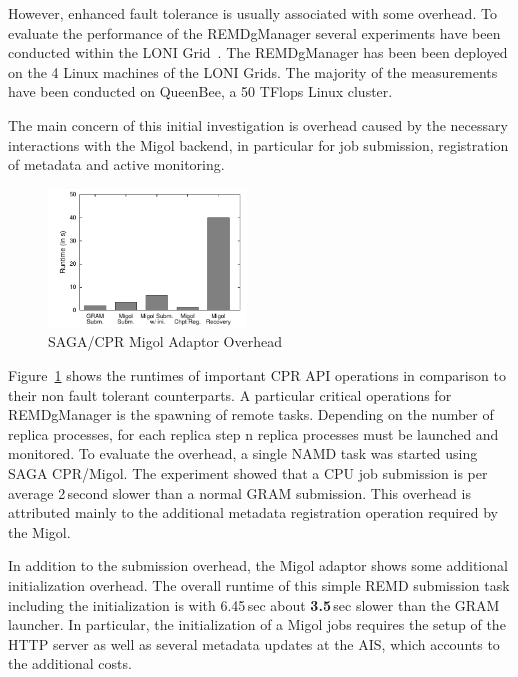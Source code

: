 \documentclass[times, 10pt,twocolumn]{article}
\begin{document}
However, enhanced fault tolerance is usually associated with some overhead. To evaluate the performance of the REMDgManager several experiments have been conducted within the LONI Grid~\cite{Allen:2003xy}. The REMDgManager has been been deployed on the 4 Linux machines of the LONI Grids. The majority of the measurements have been conducted on QueenBee, a 50 TFlops Linux cluster.

The main concern of this initial investigation is overhead caused by the necessary interactions with the Migol backend, in particular for job submission, registration of metadata and active monitoring.
\begin{figure}[htbp]
    \centering
        \includegraphics[width=0.47\textwidth]{performance/perf_submission.pdf}
    \caption{SAGA/CPR Migol Adaptor Overhead}
    \label{fig:performance_perf_submission}
\end{figure}           
Figure~\ref{fig:performance_perf_submission} shows the runtimes of important CPR API operations 
in comparison to their non fault tolerant counterparts. A particular critical operations for 
REMDgManager is the spawning of remote tasks. Depending on the number of replica processes, 
for each replica step n replica processes must be launched and monitored.  To evaluate the 
overhead, a single NAMD task was started using SAGA CPR/Migol.  The experiment showed that a 
CPU job submission is per average 2\,second slower than a normal GRAM submission. This overhead 
is attributed mainly to the additional metadata registration operation required by the Migol. 

In addition to the submission overhead, the Migol adaptor shows some additional initialization 
overhead. The overall runtime of this simple REMD submission task  including the initialization 
is with 6.45\,sec about \textbf{3.5}\,sec slower than the GRAM launcher. In particular, 
the initialization of a Migol jobs requires the setup of the HTTP server as well as several 
metadata updates at the AIS, which accounts to the additional costs.
                                                                                                                     
\end{document}
